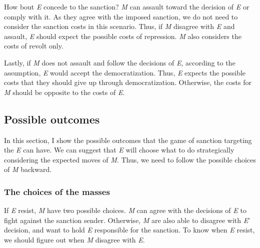 \documentclass[11pt]{article}
\begin{document}
	How bout \textit{E} concede to the sanction? \textit{M} can assault toward the decision of \textit{E} or comply with it. As they agree with the imposed sanction, we do not need to consider the sanction costs in this scenario. Thus, if \textit{M} disagree with \textit{E} and assault, \textit{E} should expect the possible costs of repression. \textit{M} also considers the costs of revolt only.
	
	Lastly, if \textit{M} does not assault and follow the decisions of \textit{E}, according to the assumption, \textit{E} would accept the democratization. Thus, \textit{E} expects the possible costs that they should give up through democratization. Otherwise, the costs for \textit{M} should be opposite to the costs of \textit{E}.
	
	\subsection*{Possible outcomes}
	
	In this section, I show the possible outcomes that the game of sanction targeting the \textit{E} can have. We can suggest that \textit{E} will choose what to do strategically considering the expected moves of \textit{M}. Thus, we need to follow the possible choices of \textit{M} backward.
	
	\subsubsection*{The choices of the masses}
	
	If \textit{E} resist, \textit{M} have two possible choices. \textit{M} can agree with the decisions of \textit{E} to fight against the sanction sender. Otherwise,  \textit{M} are also able to disagree with \textit{E}' decision, and want to hold \textit{E} responsible for the sanction. To know when \textit{E} resist, we should figure out when \textit{M} disagree with \textit{E}.
	
\end{document}
